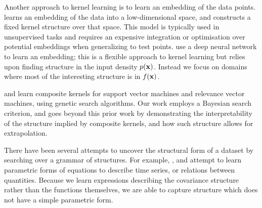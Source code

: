 Another approach to kernel learning is to learn an embedding of the data points. 
\citet{lawrence2005probabilistic} learns an embedding of the data into a low-dimensional space, and constructs a fixed kernel structure over that space.
This model is typically used in unsupervised tasks and requires an expensive integration or optimisation over potential embeddings when generalizing to test points.
\citet{salakhutdinov2008using} use a deep neural network to learn an embedding;
this is a flexible approach to kernel learning but relies upon finding structure in the input density $p({\bf{x}})$.
Instead we focus on domains where most of the interesting structure is in $f({\bf{x}})$.

\citet{diosan2007evolving} and \citet{bing2010gp} learn composite kernels for support vector machines and relevance vector machines, using genetic search algorithms.
Our work employs a Bayesian search criterion, and goes beyond this prior work by demonstrating the interpretability of the structure implied by composite kernels, and how such structure allows for extrapolation.



There have been several attempts to uncover the structural form of a dataset by searching over a grammar of structures. For example, \cite{Schmidt2009b}, \cite{todorovski1997declarative} and \cite{washio1999discovering} attempt to learn parametric forms of equations to describe time series, or relations between quantities. Because we learn expressions describing the covariance structure rather than the functions themselves, we are able to capture structure which does not have a simple parametric form.

